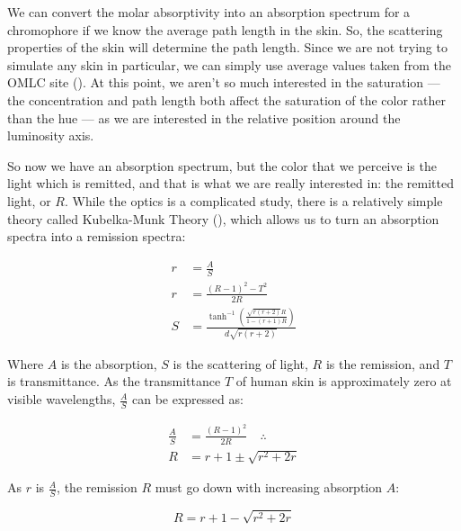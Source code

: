 We can convert the molar absorptivity into an absorption spectrum for a chromophore if we know the average path length in the skin. So, the scattering properties of the skin will determine the path length. Since we are not trying to simulate any skin in particular, we can simply use average values taken from the OMLC site (\cite{OMLC2001}). At this point, we aren't so much interested in the saturation --- the concentration and path length both affect the saturation of the color rather than the hue --- as we are interested in the relative position around the luminosity axis.

So now we have an absorption spectrum, but the color that we perceive is the light which is remitted, and that is what we are really interested in: the remitted light, or $R$. While the optics is a complicated study, there is a relatively simple theory called Kubelka-Munk Theory (\cite{Kubelka1931,Kubelka:48,Kubelka:54}), which allows us to turn an absorption spectra into a remission spectra:

\begin{align}\label{eq:KubelkaMunk}
r &=\frac{A}{S} \\
r & =\frac{(R-1)^2-T^2}{2 R} \\
S & =\frac{\tanh ^{-1}\left(\frac{\sqrt{r (r+2)} R}{1-(r+1) R}\right)}{d \sqrt{r (r+2)}}
\end{align}

Where $A$ is the absorption, $S$ is the scattering of light, $R$ is the remission, and $T$ is transmittance. As the transmittance $T$ of human skin is approximately zero at visible wavelengths, $\frac{A}{S}$ can be expressed as:

\begin{align}\label{eq:KubelkaMunk2}
\frac{A}{S} &=\frac{(R-1)^2}{2 R} \quad \therefore\\
R &= r+1 \pm \sqrt{r^2+2 r}
\end{align}

As $r$ is $\frac{A}{S}$, the remission $R$ must go down with increasing absorption $A$:

\begin{equation}\label{eq:KubelkaMunk3}
R = r+1 - \sqrt{r^2+2 r}
\end{equation}

